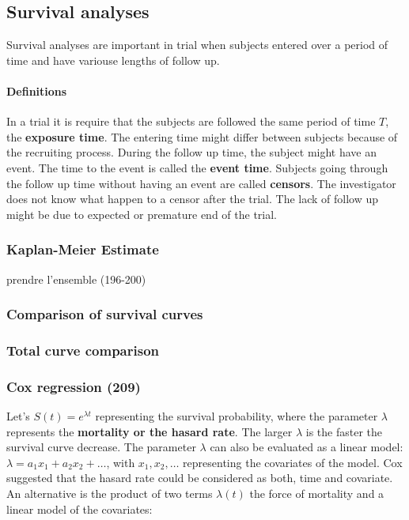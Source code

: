 \documentclass[final, paper=letter,5p,times,twocolumn]{elsarticle}
\theoremstyle{definition}
\begin{document}
\subsection{Survival analyses}

Survival analyses are important in trial when subjects entered over a period of time and have variouse lengths of follow up.

\paragraph{Definitions}{In a trial it is require that the subjects are followed the same period of time $T$, the {\bf exposure time}. The entering time might differ between subjects because of the recruiting process. During the follow up time, the subject might have an event. The time to the event is called the {\bf event time}. Subjects going through the follow up time without having an event are called {\bf censors}. The investigator does not know what happen to a censor after the trial. The lack of follow up might be due to expected or premature end of the trial. }

\subsubsection{Kaplan-Meier Estimate}
prendre l'ensemble (196-200)

\subsubsection{Comparison of survival curves}

\subsubsection{Total curve comparison}

\subsubsection{Cox regression (209)}

Let's $S(t) = e^{\lambda t}$ representing the survival probability, where the parameter $\lambda$ represents the {\bf mortality or the hasard rate}. The larger $\lambda$ is the faster the survival curve decrease. The parameter $\lambda$ can also be evaluated as a linear model: $\lambda = a_{1}x_{1} + a_{2}x_{2} + \dots$, with $x_{1}, x_{2}, \dots$ representing the covariates of the model. Cox suggested that the hasard rate could be considered as both, time and covariate. An alternative is the product of two terms $\lambda(t)$ the force of mortality and a linear model of the covariates: 
\end{document}
